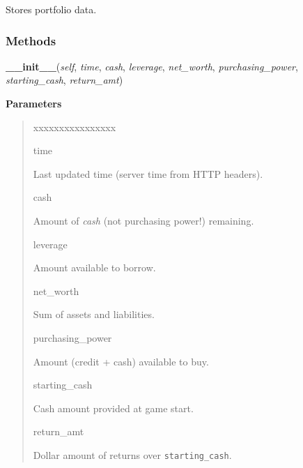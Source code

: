     \label{moira:Portfolio}
Stores portfolio data.



  \subsubsection{Methods}

    \label{moira:Portfolio:__init__}

    \vspace{0.5ex}

\hspace{.8\funcindent}\begin{boxedminipage}{\funcwidth}

    \raggedright \textbf{\_\_init\_\_}(\textit{self}, \textit{time}, \textit{cash}, \textit{leverage}, \textit{net\_worth}, \textit{purchasing\_power}, \textit{starting\_cash}, \textit{return\_amt})

\setlength{\parskip}{2ex}
\setlength{\parskip}{1ex}
      \textbf{Parameters}
      \vspace{-1ex}

      \begin{quote}
        \begin{Ventry}{xxxxxxxxxxxxxxxx}

          \item[time]

          Last updated time (server time from HTTP headers).

          \item[cash]

          Amount of \textit{cash} (not purchasing power!) remaining.

          \item[leverage]

          Amount available to borrow.

          \item[net\_worth]

          Sum of assets and liabilities.

          \item[purchasing\_power]

          Amount (credit + cash) available to buy.

          \item[starting\_cash]

          Cash amount provided at game start.

          \item[return\_amt]

          Dollar amount of returns over \texttt{starting\_cash}.

        \end{Ventry}

      \end{quote}

    \end{boxedminipage}

